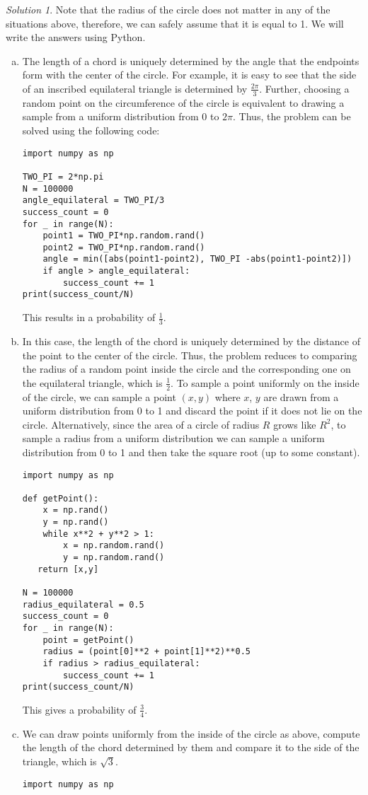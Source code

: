 \documentclass[12pt, letterpaper]{amsart}
\numberwithin{equation}{section} %
\theoremstyle{definition}
\theoremstyle{remark}
\newtheorem*{solution}{Solution}
\begin{document}
\begin{solution}
Note that the radius of the circle does not matter in any of the situations above, therefore, we can safely assume that it is equal to 1. We will write the answers using Python.
\begin{enumerate}[a.]
\item The length of a chord is uniquely determined by the angle that the endpoints form with the center of the circle. For example, it is easy to see that the side of an inscribed equilateral triangle is determined by $\frac{2\pi}3$. Further, choosing a random point on the circumference of the circle is equivalent to drawing a sample from a uniform distribution from 0 to $2\pi$. Thus, the problem can be solved using the following code:
\begin{lstlisting}
import numpy as np

TWO_PI = 2*np.pi
N = 100000
angle_equilateral = TWO_PI/3
success_count = 0
for _ in range(N):
    point1 = TWO_PI*np.random.rand()
    point2 = TWO_PI*np.random.rand()
    angle = min([abs(point1-point2), TWO_PI -abs(point1-point2)])
    if angle > angle_equilateral:
        success_count += 1
print(success_count/N)
\end{lstlisting}
This results in a probability of $\frac13$.
\item In this case, the length of the chord is uniquely determined by the distance of the point to the center of the circle. Thus, the problem reduces to comparing the radius of a random point inside the circle and the corresponding one on the equilateral triangle, which is $\frac12$. To sample a point uniformly on the inside of the circle, we can sample a point $(x, y)$ where $x$, $y$ are drawn from a uniform distribution from 0 to 1 and discard the point if it does not lie on the circle. Alternatively, since the area of a circle of radius $R$ grows like $R^2$, to sample a radius from a uniform distribution we can sample a uniform distribution from 0 to 1 and then take the square root (up to some constant).
\begin{lstlisting}
import numpy as np

def getPoint():
    x = np.rand()
    y = np.rand()
    while x**2 + y**2 > 1:
        x = np.random.rand()
        y = np.random.rand()
   return [x,y]

N = 100000
radius_equilateral = 0.5
success_count = 0
for _ in range(N):
    point = getPoint()
    radius = (point[0]**2 + point[1]**2)**0.5
    if radius > radius_equilateral:
        success_count += 1
print(success_count/N)
\end{lstlisting}
This gives a probability of $\frac 34$.
\item We can draw points uniformly from the inside of the circle as above, compute the length of the chord determined by them and compare it to the side of the triangle, which is $\sqrt{3}$.
\begin{lstlisting}
import numpy as np


\end{lstlisting}
\end{enumerate}
\end{solution}
\end{document}
